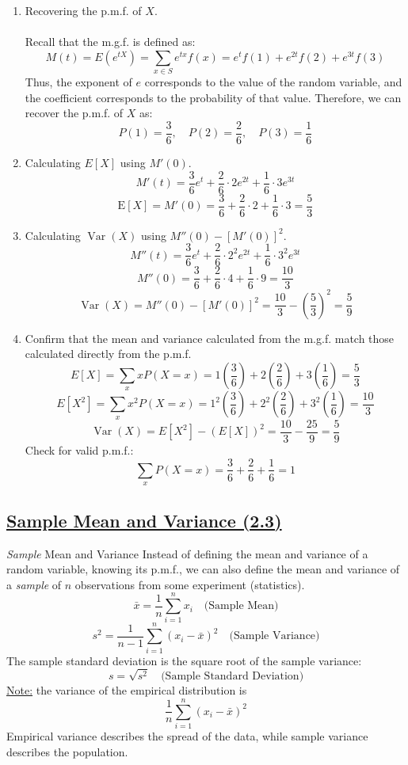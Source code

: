 ﻿\documentclass[12pt]{article}
\begin{document}
\begin{enumerate}
    \item Recovering the p.m.f. of $X$.\\\\
    Recall that the m.g.f. is defined as:
    \[
M(t)=E(e^{tX})=\sum_{x\in S}e^{tx}f(x)
=e^tf(1)+e^{2t}f(2)+e^{3t}f(3)
\]
Thus, the exponent of $e$ corresponds to the value of the random variable, and the coefficient corresponds to the probability of that value. Therefore, we can recover the p.m.f. of $X$ as:
\[P(1) = \frac{3}{6}, \quad P(2) = \frac{2}{6}, \quad P(3) = \frac{1}{6}\]
    \item Calculating $E[X]$ using $M'(0)$.\\
    \[M'(t) = \frac{3}{6}e^t + \frac{2}{6} \cdot 2e^{2t} + \frac{1}{6} \cdot 3e^{3t}\]
    \[\mathrm{E}[X]=M'(0)= \frac{3}{6} + \frac{2}{6} \cdot 2 + \frac{1}{6} \cdot 3 = \frac53 \]
    \item Calculating $\operatorname{Var}(X)$ using $M''(0)-[M'(0)]^2$.
    \[M''(t) = \frac{3}{6}e^t + \frac{2}{6} \cdot 2^2e^{2t} + \frac{1}{6} \cdot 3^2e^{3t}\]
\[M''(0) = \frac{3}{6} + \frac{2}{6} \cdot 4 + \frac{1}{6} \cdot 9 = \frac{10}{3}\]
\[\operatorname{Var}(X)=M''(0)-[M'(0)]^2=\frac{10}{3}-\left(\frac{5}{3}\right)^2=\frac{5}{9}\]
\item Confirm that the mean and variance calculated from the m.g.f. match those calculated directly from the p.m.f.
\[
E[X]=\sum_x xP(X=x)=1\left(\frac36\right)+2\left(\frac26\right)+3\left(\frac16\right)=\frac53
\]
\[
E[X^2]=\sum_x x^2P(X=x)=1^2\left(\frac36\right)+2^2\left(\frac26\right)+3^2\left(\frac16\right)=\frac{10}{3}
\]
\[
\operatorname{Var}(X)=E[X^2]-(E[X])^2=\frac{10}{3}-\frac{25}{9}=\frac59
\]
Check for valid p.m.f.:
\[
\sum_x P(X=x)=\frac36+\frac26+\frac16=1
\]
\end{enumerate}
\newpage
\subsection*{\underline{Sample Mean and Variance (2.3)}}
\begin{definition}{\textit{Sample} Mean and Variance}
    Instead of defining the mean and variance of a random variable, knowing its p.m.f., we can also define the mean and variance of a \textit{sample} of $n$ observations from some experiment (statistics).
\[
\boxed{\bar{x}=\frac1n\sum_{i=1}^{n}x_i\quad \text{(Sample Mean)}}
\]
\[
\boxed{s^2=\frac{1}{n-1}\sum_{i=1}^{n}(x_i-\bar{x})^2 \quad \text{(Sample Variance)}}
\]
The sample standard deviation is the square root of the sample variance:
\[\boxed{s=\sqrt{s^2} \quad \text{(Sample Standard Deviation)}}\]
\underline{Note:} the variance of the empirical distribution is 
\[\frac{1}{n}\sum_{i=1}^{n}(x_i-\bar{x})^2\]
Empirical variance describes the spread of the data, while sample variance describes the population.
\end{definition}
\end{document}
